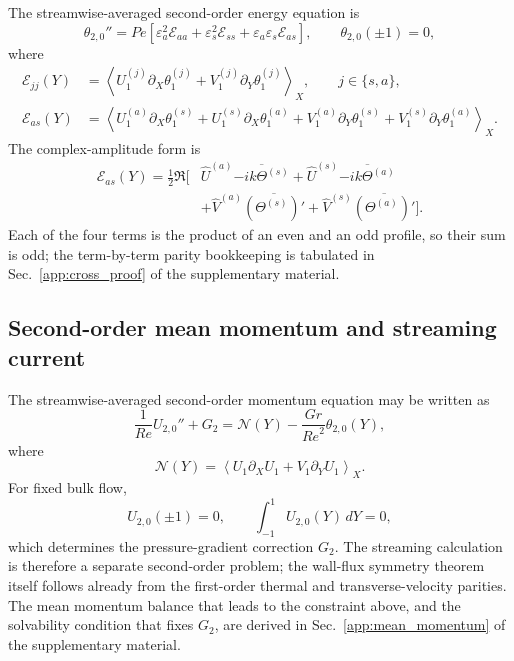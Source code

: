 \documentclass[12pt,a4paper]{article}
\newcommand{\Rey}{\mathit{Re}}
\newcommand{\Pe}{\mathit{Pe}}
\newcommand{\Grr}{\mathit{Gr}}
\begin{document}
The streamwise-averaged second-order energy equation is
\begin{equation}
  \theta_{2,0}''=\Pe\left[
  \varepsilon_a^2\mathcal E_{aa}+\varepsilon_s^2\mathcal E_{ss}
  +\varepsilon_a\varepsilon_s\mathcal E_{as}\right],
  \qquad \theta_{2,0}(\pm1)=0,
  \label{eq:theta20}
\end{equation}
where
\begin{align}
  \mathcal E_{jj}(Y)&=\left\langle U_1^{(j)}\partial_X\theta_1^{(j)}+V_1^{(j)}\partial_Y\theta_1^{(j)}\right\rangle_X,
  \qquad j\in\{s,a\},\\
  \mathcal E_{as}(Y)&=\left\langle
  U_1^{(a)}\partial_X\theta_1^{(s)}+U_1^{(s)}\partial_X\theta_1^{(a)}
  +V_1^{(a)}\partial_Y\theta_1^{(s)}+V_1^{(s)}\partial_Y\theta_1^{(a)}
  \right\rangle_X.
  \label{eq:E_cross}
\end{align}
The complex-amplitude form is
\begin{equation}
\begin{aligned}
\mathcal E_{as}(Y)=\frac12\Re\Big[&
\widehat U^{(a)}\overline{-ik\Theta^{(s)}}
+\widehat U^{(s)}\overline{-ik\Theta^{(a)}}\\
&+\widehat V^{(a)}\overline{(\Theta^{(s)})'}
+\widehat V^{(s)}\overline{(\Theta^{(a)})'}\Big].
\end{aligned}
\label{eq:E_cross_complex}
\end{equation}
Each of the four terms is the product of an even and an odd profile, so their sum is
odd; the term-by-term parity bookkeeping is tabulated in
Sec.~\ref{app:cross_proof} of the supplementary material.

\subsection{Second-order mean momentum and streaming current}

The streamwise-averaged second-order momentum equation may be written as
\begin{equation}
  \frac{1}{\Rey}U_{2,0}''+G_2
  =\mathcal N(Y)-\frac{\Grr}{\Rey^2}\theta_{2,0}(Y),
  \label{eq:mean_momentum}
\end{equation}
where
\begin{equation}
  \mathcal N(Y)=\left\langle U_1\partial_XU_1+V_1\partial_YU_1\right\rangle_X.
\end{equation}
For fixed bulk flow,
\begin{equation}
  U_{2,0}(\pm1)=0,\qquad \int_{-1}^{1}U_{2,0}(Y)\,dY=0,
  \label{eq:mean_flux_constraint}
\end{equation}
which determines the pressure-gradient correction $G_2$. The streaming calculation is therefore a
separate second-order problem; the wall-flux symmetry theorem itself follows already from the first-order
thermal and transverse-velocity parities. The mean momentum balance that leads to the constraint above, and
the solvability condition that fixes $G_2$, are derived in Sec.~\ref{app:mean_momentum} of the supplementary material.
\end{document}
